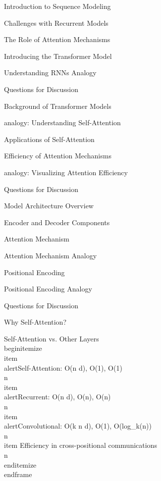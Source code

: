 \documentclass{beamer}
\begin{document}
\begin{frame}[]{Introduction to Sequence Modeling}
\begin{frame}[]{Challenges with Recurrent Models}
\begin{frame}[]{The Role of Attention Mechanisms}
\begin{frame}[]{Introducing the Transformer Model}
\begin{frame}[plain]{Understanding RNNs Analogy}
\begin{frame}[]{Questions for Discussion}
\begin{frame}[]{Background of Transformer Models}
\begin{frame}[plain]{analogy: Understanding Self-Attention}
\begin{frame}[]{Applications of Self-Attention}
\begin{frame}[]{Efficiency of Attention Mechanisms}
\begin{frame}[plain]{analogy: Visualizing Attention Efficiency}
\begin{frame}[]{Questions for Discussion}
\begin{frame}[]{Model Architecture Overview}
\begin{frame}[]{Encoder and Decoder Components}
\begin{frame}[]{Attention Mechanism}
\begin{frame}[plain]{Attention Mechanism Analogy}
\begin{frame}[]{Positional Encoding}
\begin{frame}[plain]{Positional Encoding Analogy}
\begin{frame}[]{Questions for Discussion}
\begin{frame}[]{Why Self-Attention?}
\begingroup
{}\n{}\n\begin{frame}[]{Self-Attention vs. Other Layers}\n\\begin{itemize}
\\item \\alert{Self-Attention: O(n d), O(1), O(1)}\\n\\item \\alert{Recurrent: O(n d), O(n), O(n)}\\n\\item \\alert{Convolutional: O(k n d), O(1), O(log\_k(n))}\\n\\item Efficiency in cross-positional communications\\n\\end{itemize}
\\end{frame}

\endgroup


\end{frame}
\end{frame}
\end{frame}
\end{frame}
\end{frame}
\end{frame}
\end{frame}
\end{frame}
\end{frame}
\end{frame}
\end{frame}
\end{frame}
\end{frame}
\end{frame}
\end{frame}
\end{frame}
\end{frame}
\end{frame}
\end{frame}
\end{frame}
\end{frame}
\end{document}

